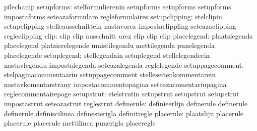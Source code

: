                                   pilechamp
                      setupforms: stelformulierenin                setupforms
                                  setupforms                       setupforms
                                  impostaforms                     seteazaformulare
                                  regleformulaires
                   setupclipping: stelclipin                       setupclipping
                                  stelleausschnittein              nastavorez
                                  impostaclippling                 seteazaclipping
                                  regleclipping
                            clip: clip                             clip
                                  ausschnitt                       orez
                                  clip                             clip
                                  clip
                     placelegend: plaatslegenda                    placelegend
                                  platzierelegende                 umistilegendu
                                  mettilegenda                     punelegenda
                                  placelegende
                     setuplegend: stellegendain                    setuplegend
                                  stellelegendeein                 nastavlegendu
                                  impostalegenda                   seteazalegenda
                                  reglelegende
                setuppagecomment: stelpaginacommentaarin           setuppagecomment
                                  stelleseitenkommentarein         nastavkomentarstrany
                                  impostacommentopagina            seteazacomentariupagina
                                  reglecommentairepage
                      setupstrut: stelstrutin                      setupstrut
                                  setupstrut                       setupstrut
                                  impostastrut                     seteazastrut
                                  reglestrut
                      definerule: definieerlijn                    definerule
                                  definerule                       definerule
                                  definiscilinea                   definesterigla
                                  definitregle
                       placerule: plaatslijn                       placerule
                                  placerule                        placerule
                                  mettilinea                       punerigla
                                  placeregle
